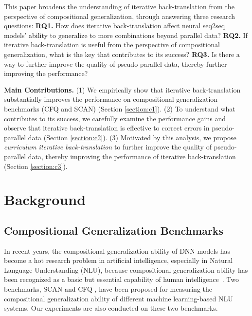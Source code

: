 \documentclass[letterpaper]{article} %
\begin{document}
This paper broadens the understanding of iterative back-translation from the perspective of compositional generalization, through answering three research questions:
\textbf{RQ1. } How does iterative back-translation affect neural seq2seq models' ability to generalize to more combinations beyond parallel data?
\textbf{RQ2. } If iterative back-translation is useful from the perspective of compositional generalization, what is the key that contributes to its success?
\textbf{RQ3. } Is there a way to further improve the quality of pseudo-parallel data, thereby further improving the performance?

\textbf{Main Contributions.}
(1) We empirically show that iterative back-translation substantially improves the performance on compositional generalization benchmarks (CFQ and SCAN) (Section \ref{section:c1}).
(2) To understand what contributes to its success, we carefully examine the performance gains and observe that iterative back-translation is effective to correct errors in pseudo-parallel data  (Section \ref{section:c2}).
(3) Motivated by this analysis, we propose \emph{curriculum iterative back-translation} to further improve the quality of pseudo-parallel data, thereby improving the performance of iterative back-translation (Section \ref{section:c3}).

\section{Background}

\subsection{Compositional Generalization Benchmarks}
\label{section:tasks}

In recent years, the compositional generalization ability of DNN models has become a hot research problem in artificial intelligence, especially in Natural Language Understanding (NLU), because compositional generalization ability has been recognized as a basic but essential capability of human intelligence~\cite{lake2017building}.
Two benchmarks, SCAN \cite{lake2018generalization} and CFQ \cite{keysers2020measuring}, have been proposed for measuring the compositional generalization ability of different machine learning-based NLU systems.
Our experiments are also conducted on these two benchmarks.
\end{document}
